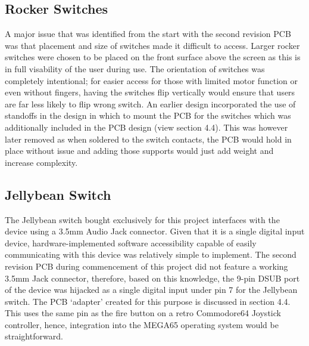 
\subsection{Rocker Switches}

A major issue that was identified from the start with the second revision PCB was that placement and size of switches made it difficult to access.
Larger rocker switches were chosen to be placed on the front surface above the screen as this is in full visability of the user during use.
The orientation of switches was completely intentional; for easier access for those with limited motor function or even without fingers, having the switches flip vertically would ensure that users are far less likely to flip wrong switch.
An earlier design incorporated the use of standoffs in the design in which to mount the PCB for the switches which was additionally included in the PCB design (view section 4.4). %
This was however later removed as when soldered to the switch contacts, the PCB would hold in place without issue and adding those supports would just add weight and increase complexity.

\subsection{Jellybean Switch}

The Jellybean switch bought exclusively for this project interfaces with the device using a 3.5mm Audio Jack connector. 
Given that it is a single digital input device, hardware-implemented software accessibility capable of easily communicating with this device was relatively simple to implement. 
The second revision PCB during commencement of this project did not feature a working 3.5mm Jack connector, therefore, based on this knowledge, the 9-pin DSUB port of the device was hijacked as a single digital input under pin 7 for the Jellybean switch. 
The PCB ‘adapter’ created for this purpose is discussed in section 4.4. %
This uses the same pin as the fire button on a retro Commodore64 Joystick controller, hence, integration into the MEGA65 operating system would be straightforward.

